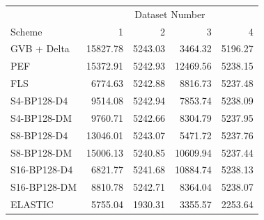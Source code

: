 \begin{tabular}{lrrrr}
\toprule
 & \multicolumn{4}{c}{Dataset Number} \\
Scheme & 1 & 2 & 3 & 4 \\
\midrule
GVB + Delta & 15827.78 & 5243.03 & 3464.32 & 5196.27 \\
PEF & 15372.91 & 5242.93 & 12469.56 & 5238.15 \\
FLS & 6774.63 & 5242.88 & 8816.73 & 5237.48 \\
S4-BP128-D4 & 9514.08 & 5242.94 & 7853.74 & 5238.09 \\
S4-BP128-DM & 9760.71 & 5242.66 & 8304.79 & 5237.95 \\
S8-BP128-D4 & 13046.01 & 5243.07 & 5471.72 & 5237.76 \\
S8-BP128-DM & 15006.13 & 5240.85 & 10609.94 & 5237.44 \\
S16-BP128-D4 & 6821.77 & 5241.68 & 10884.74 & 5238.13 \\
S16-BP128-DM & 8810.78 & 5242.71 & 8364.04 & 5238.07 \\
ELASTIC & 5755.04 & 1930.31 & 3355.57 & 2253.64 \\
\bottomrule
\end{tabular}
